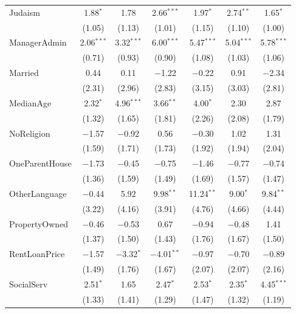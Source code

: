 \documentclass[11pt,a4paper,]{article}
\begin{document}
\begin{table}[!htbp]
\begin{tabular}{@{\extracolsep{1pt}}lcccccc}
 Judaism & 1.88$^{*}$ & 1.78 & 2.66$^{***}$ & 1.97$^{*}$ & 2.74$^{**}$ & 1.65$^{*}$ \\ 
  & (1.05) & (1.13) & (1.01) & (1.15) & (1.10) & (1.00) \\ 

 ManagerAdmin & 2.06$^{***}$ & 3.32$^{***}$ & 6.00$^{***}$ & 5.47$^{***}$ & 5.04$^{***}$ & 5.78$^{***}$ \\ 
  & (0.71) & (0.93) & (0.90) & (1.08) & (1.03) & (1.06) \\ 

 Married & 0.44 & 0.11 & $-$1.22 & $-$0.22 & 0.91 & $-$2.34 \\ 
  & (2.31) & (2.96) & (2.83) & (3.15) & (3.03) & (2.81) \\ 

 MedianAge & 2.32$^{*}$ & 4.96$^{***}$ & 3.66$^{**}$ & 4.00$^{*}$ & 2.30 & 2.87 \\ 
  & (1.32) & (1.65) & (1.81) & (2.26) & (2.08) & (1.79) \\ 

 NoReligion & $-$1.57 & $-$0.92 & 0.56 & $-$0.30 & 1.02 & 1.31 \\ 
  & (1.59) & (1.71) & (1.73) & (1.92) & (1.94) & (2.04) \\ 

 OneParentHouse & $-$1.73 & $-$0.45 & $-$0.75 & $-$1.46 & $-$0.77 & $-$0.74 \\ 
  & (1.36) & (1.59) & (1.49) & (1.69) & (1.57) & (1.47) \\ 

 OtherLanguage & $-$0.44 & 5.92 & 9.98$^{**}$ & 11.24$^{**}$ & 9.00$^{*}$ & 9.84$^{**}$ \\ 
  & (3.22) & (4.16) & (3.91) & (4.76) & (4.66) & (4.44) \\ 

 PropertyOwned & $-$0.46 & $-$0.53 & 0.67 & $-$0.94 & $-$0.48 & 1.41 \\ 
  & (1.37) & (1.50) & (1.43) & (1.76) & (1.67) & (1.50) \\ 

 RentLoanPrice & $-$1.57 & $-$3.32$^{*}$ & $-$4.01$^{**}$ & $-$0.97 & $-$0.70 & $-$0.89 \\ 
  & (1.49) & (1.76) & (1.67) & (2.07) & (2.07) & (2.16) \\ 

 SocialServ & 2.51$^{*}$ & 1.65 & 2.47$^{*}$ & 2.53$^{*}$ & 2.35$^{*}$ & 4.45$^{***}$ \\ 
  & (1.33) & (1.41) & (1.29) & (1.47) & (1.32) & (1.19) \\ 


\end{tabular}
\end{table}
\end{document}
